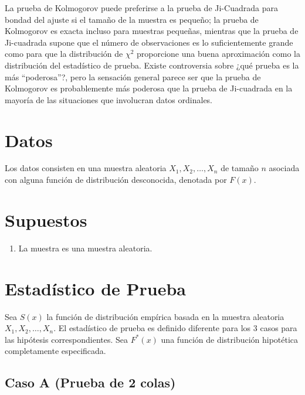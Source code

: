 \documentclass[
  a4paper,
  oneside,
  openany]{book}
\providecommand{\tightlist}{%
  \setlength{\itemsep}{0pt}\setlength{\parskip}{0pt}}
\begin{document}
La prueba de Kolmogorov puede preferirse a la prueba de Ji-Cuadrada para bondad del ajuste si el tamaño de la muestra es pequeño; la prueba de Kolmogorov es exacta incluso para muestras pequeñas, mientras que la prueba de Ji-cuadrada supone que el número de observaciones es lo suficientemente grande como para que la distribución de \(\chi^2\) proporcione una buena aproximación como la distribución del estadístico de prueba. Existe controversia sobre ¿qué prueba es la más ``poderosa''?, pero la sensación general parece ser que la prueba de Kolmogorov es probablemente más poderosa que la prueba de Ji-cuadrada en la mayoría de las situaciones que involucran datos ordinales.

\hypertarget{datos-15}{%
\section{Datos}\label{datos-15}}

Los datos consisten en una muestra aleatoria \(X_{1},X_{2},\ldots,X_{n}\) de tamaño \(n\) asociada con alguna función de distribución desconocida, denotada por \(F(x)\).

\hypertarget{supuestos-13}{%
\section{Supuestos}\label{supuestos-13}}

\begin{enumerate}
\def\labelenumi{\arabic{enumi})}
\tightlist
\item
  La muestra es una muestra aleatoria.
\end{enumerate}

\hypertarget{estaduxedstico-de-prueba-14}{%
\section{Estadístico de Prueba}\label{estaduxedstico-de-prueba-14}}

Sea \(S(x)\) la función de distribución empírica basada en la muestra aleatoria \(X_{1},X_{2},\ldots,X_{n}\). El estadístico de prueba es definido diferente para los 3 casos para las hipótesis correspondientes. Sea \(F^*(x)\) una función de distribución hipotética completamente especificada.

\hypertarget{caso-a-prueba-de-2-colas}{%
\subsection*{Caso A (Prueba de 2 colas)}\label{caso-a-prueba-de-2-colas}}
\end{document}
